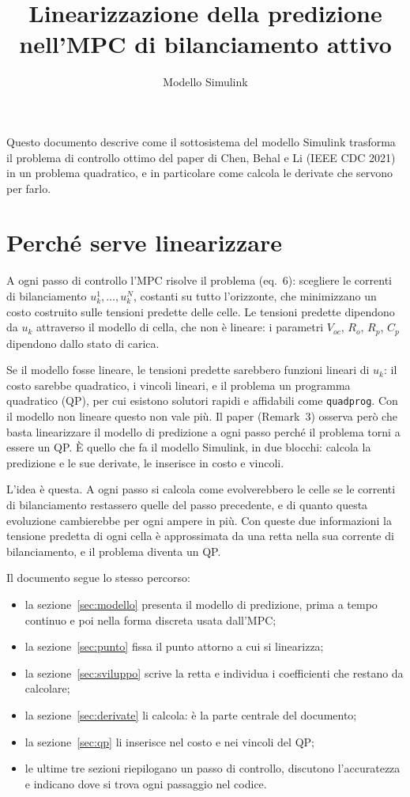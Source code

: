 \documentclass[11pt,a4paper]{article}
\title{Linearizzazione della predizione\\nell'MPC di bilanciamento attivo}
\author{Modello Simulink \file{Bilanciamento_MPC.slx}}
\date{}
\newcommand{\file}[1]{\texttt{\detokenize{#1}}}
\begin{document}
\maketitle

\noindent
Questo documento descrive come il sottosistema \file{Controllo} del modello
Simulink trasforma il problema di controllo ottimo del paper di Chen, Behal e
Li (IEEE CDC 2021) in un problema quadratico, e in particolare come calcola le
derivate che servono per farlo.

\section{Perché serve linearizzare}

A ogni passo di controllo l'MPC risolve il problema (eq.~6): scegliere le
correnti di bilanciamento $u^1_k,\dots,u^N_k$, costanti su tutto l'orizzonte,
che minimizzano un costo costruito sulle tensioni predette delle celle. Le
tensioni predette dipendono da $u_k$ attraverso il modello di cella, che non è
lineare: i parametri $V_{oc}$, $R_o$, $R_p$, $C_p$ dipendono dallo stato di
carica.

Se il modello fosse lineare, le tensioni predette sarebbero funzioni lineari
di $u_k$: il costo sarebbe quadratico, i vincoli lineari, e il problema un
programma quadratico (QP), per cui esistono solutori rapidi e affidabili come
\texttt{quadprog}. Con il modello non lineare questo non vale più. Il paper
(Remark~3) osserva però che basta linearizzare il modello di predizione a ogni
passo perché il problema torni a essere un QP. È quello che fa il modello
Simulink, in due blocchi: \file{Predizione_linearizzata} calcola la predizione
e le sue derivate, \file{Problema_QP} le inserisce in costo e vincoli.

L'idea è questa. A ogni passo si calcola come evolverebbero le celle se le
correnti di bilanciamento restassero quelle del passo precedente, e di quanto
questa evoluzione cambierebbe per ogni ampere in più. Con queste due
informazioni la tensione predetta di ogni cella è approssimata da una retta
nella sua corrente di bilanciamento, e il problema diventa un QP.

Il documento segue lo stesso percorso:
\begin{itemize}
  \item la sezione~\ref{sec:modello} presenta il modello di predizione, prima
        a tempo continuo e poi nella forma discreta usata dall'MPC;
  \item la sezione~\ref{sec:punto} fissa il punto attorno a cui si linearizza;
  \item la sezione~\ref{sec:sviluppo} scrive la retta e individua i
        coefficienti che restano da calcolare;
  \item la sezione~\ref{sec:derivate} li calcola: è la parte centrale del
        documento;
  \item la sezione~\ref{sec:qp} li inserisce nel costo e nei vincoli del QP;
  \item le ultime tre sezioni riepilogano un passo di controllo, discutono
        l'accuratezza e indicano dove si trova ogni passaggio nel codice.
\end{itemize}
\end{document}
